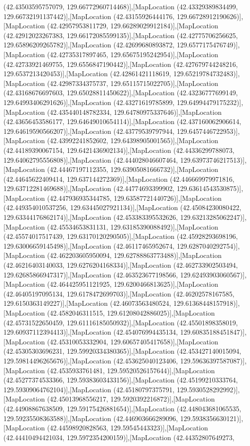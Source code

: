 (42.43503595757079, 129.66772960714468)],[MapLocation (42.43329389834499, 129.66732191137442)],[MapLocation (42.43155926444176, 129.66728912190626)],[MapLocation (42.42957953811729, 129.66289029912184)],[MapLocation (42.42912023267383, 129.66172085599135)],[MapLocation (42.42775706256625, 129.65896209265782)],[MapLocation (42.42699680893872, 129.6577175476749)],[MapLocation (42.42735317897465, 129.65675195242954)],[MapLocation (42.42733921469755, 129.6556847190442)],[MapLocation (42.427679744248216, 129.6537213420453)],[MapLocation (42.42861421118619, 129.65219784732483)],[MapLocation (42.42987334375737, 129.65115715022705)],[MapLocation (42.43168676697603, 129.65028811450622)],[MapLocation (42.43236777699149, 129.64993406291626)],[MapLocation (42.43271619785899, 129.64994479175232)],[MapLocation (42.435440148782334, 129.64780975337646)],[MapLocation (42.43656453586177, 129.64649010654114)],[MapLocation (42.437160062906614, 129.64619590566207)],[MapLocation (42.43779539797944, 129.6457446722953)],[MapLocation (42.43992241852602, 129.64398905001565)],[MapLocation (42.44189390067154, 129.6421436902134)],[MapLocation (42.44336299788073, 129.64062795556808)],[MapLocation (42.444028046607464, 129.63973746217513)],[MapLocation (42.44467197112355, 129.63905081666732)],[MapLocation (42.44645622409414, 129.637144272369)],[MapLocation (42.446669979971816, 129.63712281469688)],[MapLocation (42.44774693399902, 129.63614543530875)],[MapLocation (42.447936935344785, 129.63587721440726)],[MapLocation (42.449354010537256, 129.63445027921134)],[MapLocation (42.45084230080422, 129.63344176862174)],[MapLocation (42.453383395532626, 129.63213285062247)],[MapLocation (42.45534653831131, 129.63185390088492)],[MapLocation (42.45574017517439, 129.63170120290505)],[MapLocation (42.45928293698196, 129.63006659145498)],[MapLocation (42.46117465952674, 129.6287040292754)],[MapLocation (42.462203605950094, 129.62788863773488)],[MapLocation (42.46216403140033, 129.6276204168334)],[MapLocation (42.462733902503494, 129.62685866947317)],[MapLocation (42.463523677198566, 129.62493903060567)],[MapLocation (42.464425951121925, 129.6200466813625)],[MapLocation (42.46405197095134, 129.6178472699703)],[MapLocation (42.46202578167585, 129.6150363149227)],[MapLocation (42.46073563480524, 129.61368448157918)],[MapLocation (42.4582046311515, 129.61208042886025)],[MapLocation (42.45731522650459, 129.61116185050932)],[MapLocation (42.45501898358019, 129.60937112394413)],[MapLocation (42.454076994435134, 129.60835188451847)],[MapLocation (42.45310053332904, 129.60657405417658)],[MapLocation (42.45305303696231, 129.59920334380365)],[MapLocation (42.453427140015094, 129.59814496265676)],[MapLocation (42.453625040123406, 129.59636397587087)],[MapLocation (42.4535933761481, 129.59520526157644)],[MapLocation (42.45277374533366, 129.59383603433156)],[MapLocation (42.45199210333764, 129.59309064762104)],[MapLocation (42.45180797375791, 129.5930528292992)],[MapLocation (42.45013968556217, 129.5920392216872)],[MapLocation (42.44908867638509, 129.59175426881654)],[MapLocation (42.448043681065535, 129.59235508363588)],[MapLocation (42.446903666289096, 129.5938356630121)],[MapLocation (42.44598920828563, 129.59545443323)],[MapLocation (42.44410494421034, 129.5972354200159)],[MapLocation (42.44352807649273, 